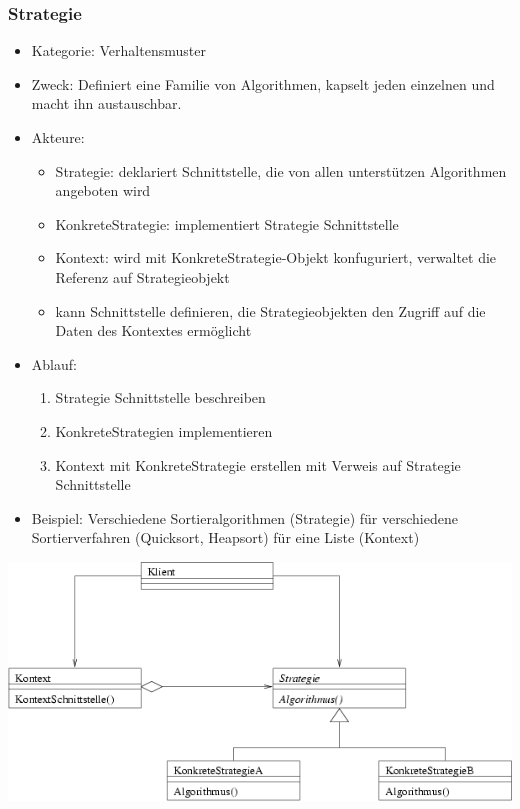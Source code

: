 \documentclass[11pt, fleqn, a4paper, leqno]{scrartcl} %
\begin{document}
		\subsubsection{Strategie}
			\begin{itemize}
				\item Kategorie: Verhaltensmuster
				\item Zweck: Definiert eine Familie von Algorithmen, kapselt jeden einzelnen und macht ihn austauschbar.
				\item Akteure: 
					\begin{itemize}
						\item Strategie: deklariert Schnittstelle, die von allen unterstützen Algorithmen angeboten wird
						\item KonkreteStrategie: implementiert Strategie Schnittstelle
						\item Kontext: wird mit KonkreteStrategie-Objekt konfuguriert, verwaltet die Referenz auf Strategieobjekt
						\item kann Schnittstelle definieren, die Strategieobjekten den Zugriff auf die Daten des Kontextes ermöglicht
					\end{itemize}
				\item Ablauf:
					\begin{enumerate}
						\item Strategie Schnittstelle beschreiben
						\item KonkreteStrategien implementieren
						\item Kontext mit KonkreteStrategie erstellen mit Verweis auf Strategie Schnittstelle
					\end{enumerate}
				\item Beispiel: Verschiedene Sortieralgorithmen (Strategie) für verschiedene Sortierverfahren (Quicksort, Heapsort) für eine Liste (Kontext)
			\end{itemize}
			\includegraphics[scale=0.7]{images/strategie.png}
			\newpage
\end{document}
